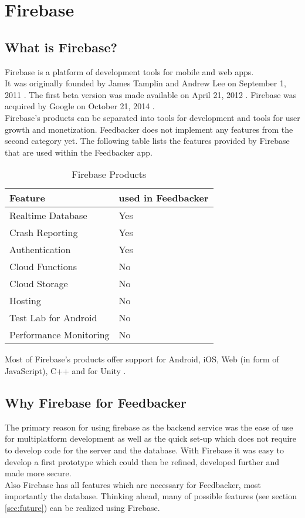 \section{Firebase}

\subsection{What is Firebase?}
Firebase is a platform of development tools for mobile and web apps.\\
It was originally founded by James Tamplin and Andrew Lee on September 1, 2011 \cite{crunchbase}. The first beta version was made available on April 21, 2012 \cite{beta}. Firebase was acquired by Google on October 21, 2014 \cite{crunchbase}.\\
Firebase's products can be separated into tools for development and tools for user growth and monetization. Feedbacker does not implement any features from the second category yet. The following table lists the features provided by Firebase that are used within the Feedbacker app.
\begin{table}[H]
\begin{center}
\begin{tabular}{l  l}
  Feature & used in Feedbacker \\
  \hline
    Realtime Database & Yes \\
    Crash Reporting & Yes \\
    Authentication & Yes \\
    Cloud Functions & No \\
    Cloud Storage & No \\
    Hosting & No \\
    Test Lab for Android & No \\
    Performance Monitoring & No \\
\end{tabular}
 \caption{Firebase Products}\label{tab_products}
 \label{table:products}
\end{center}
\end{table}

Most of Firebase's products offer support for Android, iOS, Web (in form of JavaScript), C++ and for Unity \cite{products}.



\subsection{Why Firebase for Feedbacker}
The primary reason for using firebase as the backend service was the ease of use for multiplatform development as well as the quick set-up which does not require to develop code for the server and the database. With Firebase it was easy to develop a first prototype which could then be refined, developed further and made more secure. \\
Also Firebase has all features which are necessary for Feedbacker, most importantly the database. Thinking ahead, many of possible features (see  section \ref{sec:future}) can be realized using Firebase.

